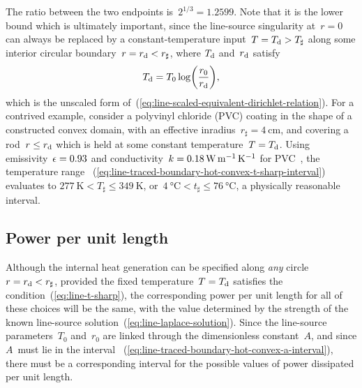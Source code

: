 The ratio between the two endpoints is~$2^{1/3} = 1.2599$.
Note that it is the lower bound which is ultimately important,
since the line-source singularity at~$r = 0$
can always be replaced by a constant-temperature input~$T = T_{\mathrm{d}} > T_\sharp$
along some interior circular boundary~$r = r_{\mathrm{d}} < r_\sharp$,
where $T_{\mathrm{d}}$ and~$r_{\mathrm{d}}$ satisfy
\begin{equation}
  T_\dir = T_0 \log \roundbr*{\frac{r_0}{r_\dir}},
  \label{eq:line-equivalent-dirichlet-relation}
\end{equation}
which is the unscaled form
of~(\ref{eq:line-scaled-equivalent-dirichlet-relation}).
For a contrived example,
consider a polyvinyl chloride (PVC) coating
in the shape of a constructed convex domain,
with an effective inradius~$r_\sharp = \SI{4}{\centi\metre}$,
and covering a rod~$r \le r_{\mathrm{d}}$
which is held at some constant temperature~$T = T_{\mathrm{d}}$.
Using emissivity~$\epsilon = 0.93$
and conductivity~$k = \SI{0.18}{\watt \per\metre \per\kelvin}$
for PVC~\cite[Table~2]{lucchi-2018-transient-radiative-rotating-pvc},
the temperature range~%
  (\ref{eq:line-traced-boundary-hot-convex-t-sharp-interval})
evaluates to $\SI{277}{\kelvin} < T_\sharp \le \SI{349}{\kelvin}$,
or~$\SI{4}{\degreeCelsius} < t_\sharp \le \SI{76}{\degreeCelsius}$,
a physically reasonable interval.

\subsection{Power per unit length}
\label{sec:polar.physical.power}

Although the internal heat generation can be specified
along \emph{any} circle~$r = r_{\mathrm{d}} < r_\sharp$,
provided the fixed temperature~$T = T_{\mathrm{d}}$
satisfies the condition~(\ref{eq:line-t-sharp}),
the corresponding power per unit length
for all of these choices will be the same,
with the value determined by the strength
of the known line-source solution~(\ref{eq:line-laplace-solution}).
Since the line-source parameters~$T_0$ and~$r_0$ are linked
through the dimensionless constant~$A$,
and since $A$~must lie in the interval~%
  (\ref{eq:line-traced-boundary-hot-convex-a-interval}),
there must be a corresponding interval for the possible values of
power dissipated per unit length.

